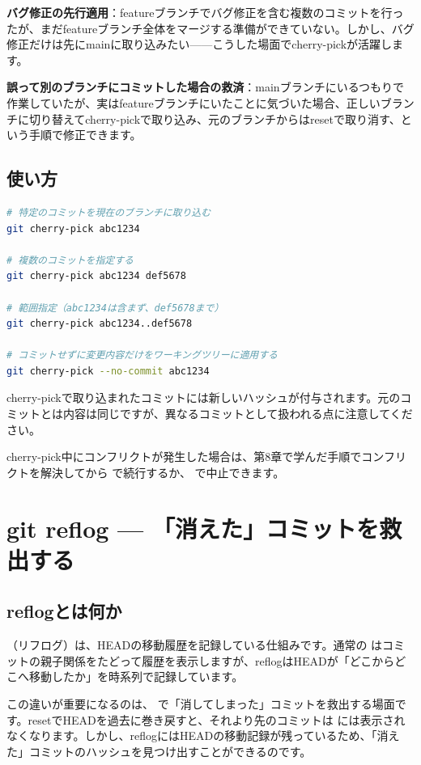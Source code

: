 \textbf{バグ修正の先行適用}：featureブランチでバグ修正を含む複数のコミットを行ったが、まだfeatureブランチ全体をマージする準備ができていない。しかし、バグ修正だけは先にmainに取り込みたい——こうした場面でcherry-pickが活躍します。

\textbf{誤って別のブランチにコミットした場合の救済}：mainブランチにいるつもりで作業していたが、実はfeatureブランチにいたことに気づいた場合、正しいブランチに切り替えてcherry-pickで取り込み、元のブランチからはresetで取り消す、という手順で修正できます。

\subsection{使い方}

\begin{lstlisting}[language=bash]
# 特定のコミットを現在のブランチに取り込む
git cherry-pick abc1234

# 複数のコミットを指定する
git cherry-pick abc1234 def5678

# 範囲指定（abc1234は含まず、def5678まで）
git cherry-pick abc1234..def5678

# コミットせずに変更内容だけをワーキングツリーに適用する
git cherry-pick --no-commit abc1234
\end{lstlisting}

cherry-pickで取り込まれたコミットには新しいハッシュが付与されます。元のコミットとは内容は同じですが、異なるコミットとして扱われる点に注意してください。

cherry-pick中にコンフリクトが発生した場合は、第8章で学んだ手順でコンフリクトを解決してから  で続行するか、 で中止できます。

\section{git reflog — 「消えた」コミットを救出する}

\subsection{reflogとは何か}

（リフログ）は、HEADの移動履歴を記録している仕組みです。通常の  はコミットの親子関係をたどって履歴を表示しますが、reflogはHEADが「どこからどこへ移動したか」を時系列で記録しています。

この違いが重要になるのは、 で「消してしまった」コミットを救出する場面です。resetでHEADを過去に巻き戻すと、それより先のコミットは  には表示されなくなります。しかし、reflogにはHEADの移動記録が残っているため、「消えた」コミットのハッシュを見つけ出すことができるのです。

